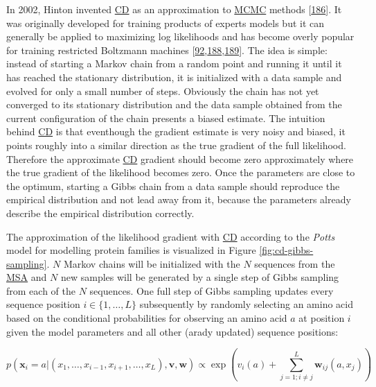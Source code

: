 \documentclass[11pt,a4paper,twoside]{book}
\newcommand{\seq}{\mathbf{x}}
\renewcommand{\v}{\mathbf{v}}
\newcommand{\vi}{v_{i}}
\newcommand{\w}{\mathbf{w}}
\newcommand{\wij}{\mathbf{w}_{ij}}
\theoremstyle{definition}
\theoremstyle{definition}
\theoremstyle{remark}
\begin{document}
In 2002, Hinton invented \protect\hyperlink{abbrev}{CD} as an
approximation to \protect\hyperlink{abbrev}{MCMC} methods
{[}\protect\hyperlink{ref-Hinton2002}{186}{]}. It was originally
developed for training products of experts models but it can generally
be applied to maximizing log likelihoods and has become overly popular
for training restricted Boltzmann machines
{[}\protect\hyperlink{ref-Murphy2012}{92},\protect\hyperlink{ref-Fischer2012}{188},\protect\hyperlink{ref-Bengio2009}{189}{]}.
The idea is simple: instead of starting a Markov chain from a random
point and running it until it has reached the stationary distribution,
it is initialized with a data sample and evolved for only a small number
of steps. Obviously the chain has not yet converged to its stationary
distribution and the data sample obtained from the current configuration
of the chain presents a biased estimate. The intuition behind
\protect\hyperlink{abbrev}{CD} is that eventhough the gradient estimate
is very noisy and biased, it points roughly into a similar direction as
the true gradient of the full likelihood. Therefore the approximate
\protect\hyperlink{abbrev}{CD} gradient should become zero approximately
where the true gradient of the likelihood becomes zero. Once the
parameters are close to the optimum, starting a Gibbs chain from a data
sample should reproduce the empirical distribution and not lead away
from it, because the parameters already describe the empirical
distribution correctly.

The approximation of the likelihood gradient with
\protect\hyperlink{abbrev}{CD} according to the \emph{Potts} model for
modelling protein families is visualized in Figure
\ref{fig:cd-gibbs-sampling}. \(N\) Markov chains will be initialized
with the \(N\) sequences from the \protect\hyperlink{abbrev}{MSA} and
\(N\) new samples will be generated by a single step of Gibbs sampling
from each of the \(N\) sequences. One full step of Gibbs sampling
updates every sequence position \(i \in \{1, \ldots, L\}\) subsequently
by randomly selecting an amino acid based on the conditional
probabilities for observing an amino acid \(a\) at position \(i\) given
the model parameters and all other (arady updated) sequence positions:

\begin{equation}
  p(\seq_i = a | (x_1, \ldots, x_{i-1}, x_{i+1}, \ldots, x_L), \v, \w) \propto \exp \left( \vi(a) + \sum_{j=1; i \ne j}^L \wij(a, x_j)  \right)
\label{eq:conditional-prob-full-likelihood}
\end{equation}
\end{document}
